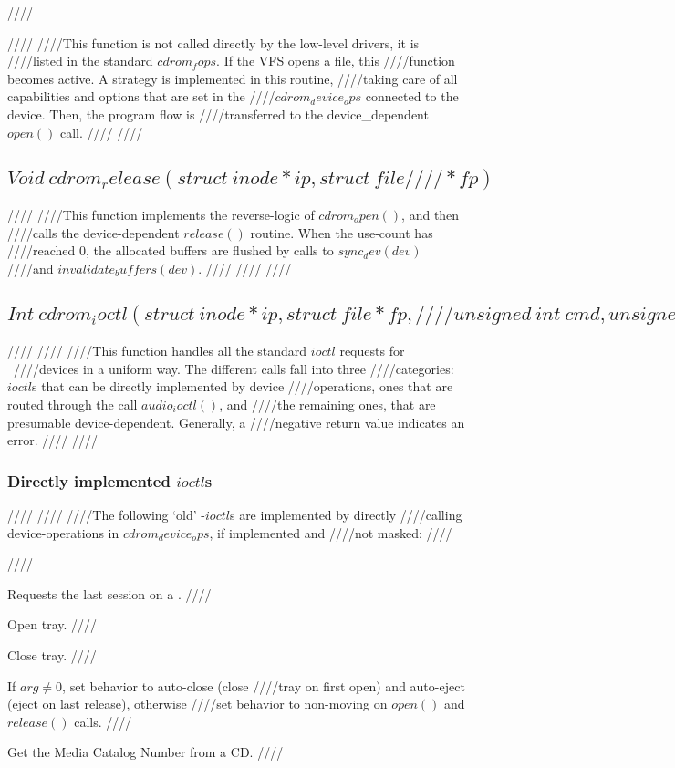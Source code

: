 ////\documentclass{article}
\begin{document}
////
////This function is not called directly by the low-level drivers, it is
////listed in the standard $cdrom_fops$. If the VFS opens a file, this
////function becomes active. A strategy is implemented in this routine,
////taking care of all capabilities and options that are set in the
////$cdrom_device_ops$ connected to the device. Then, the program flow is
////transferred to the device_dependent $open()$ call.
////
////\subsection{$Void\ cdrom_release(struct\ inode *ip, struct\ file
////*fp)$}
////
////This function implements the reverse-logic of $cdrom_open()$, and then
////calls the device-dependent $release()$ routine. When the use-count has
////reached 0, the allocated buffers are flushed by calls to $sync_dev(dev)$
////and $invalidate_buffers(dev)$.
////
////
////\subsection{$Int\ cdrom_ioctl(struct\ inode *ip, struct\ file *fp,
////unsigned\ int\ cmd, unsigned\ long\ arg)$}
////\label{cdrom-ioctl}
////
////This function handles all the standard $ioctl$ requests for \cdrom\
////devices in a uniform way. The different calls fall into three
////categories: $ioctl$s that can be directly implemented by device
////operations, ones that are routed through the call $audio_ioctl()$, and
////the remaining ones, that are presumable device-dependent. Generally, a
////negative return value indicates an error.
////
////\subsubsection{Directly implemented $ioctl$s}
////\label{ioctl-direct}
////
////The following `old' \cdrom-$ioctl$s are implemented by directly
////calling device-operations in $cdrom_device_ops$, if implemented and
////not masked:
////\begin{description}
////\item[CDROMMULTISESSION] Requests the last session on a \cdrom.
////\item[CDROMEJECT] Open tray. 
////\item[CDROMCLOSETRAY] Close tray.
////\item[CDROMEJECT_SW] If $arg\not=0$, set behavior to auto-close (close
////tray on first open) and auto-eject (eject on last release), otherwise
////set behavior to non-moving on $open()$ and $release()$ calls.
////\item[CDROM_GET_MCN] Get the Media Catalog Number from a CD.
////\end{description}
\end{document}
